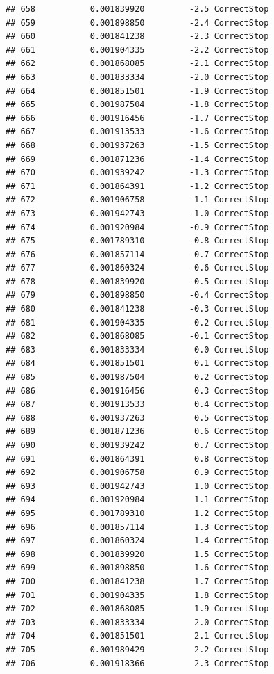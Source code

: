 \documentclass[
]{article}
\begin{document}
\begin{verbatim}
## 658           0.001839920         -2.5 CorrectStop
## 659           0.001898850         -2.4 CorrectStop
## 660           0.001841238         -2.3 CorrectStop
## 661           0.001904335         -2.2 CorrectStop
## 662           0.001868085         -2.1 CorrectStop
## 663           0.001833334         -2.0 CorrectStop
## 664           0.001851501         -1.9 CorrectStop
## 665           0.001987504         -1.8 CorrectStop
## 666           0.001916456         -1.7 CorrectStop
## 667           0.001913533         -1.6 CorrectStop
## 668           0.001937263         -1.5 CorrectStop
## 669           0.001871236         -1.4 CorrectStop
## 670           0.001939242         -1.3 CorrectStop
## 671           0.001864391         -1.2 CorrectStop
## 672           0.001906758         -1.1 CorrectStop
## 673           0.001942743         -1.0 CorrectStop
## 674           0.001920984         -0.9 CorrectStop
## 675           0.001789310         -0.8 CorrectStop
## 676           0.001857114         -0.7 CorrectStop
## 677           0.001860324         -0.6 CorrectStop
## 678           0.001839920         -0.5 CorrectStop
## 679           0.001898850         -0.4 CorrectStop
## 680           0.001841238         -0.3 CorrectStop
## 681           0.001904335         -0.2 CorrectStop
## 682           0.001868085         -0.1 CorrectStop
## 683           0.001833334          0.0 CorrectStop
## 684           0.001851501          0.1 CorrectStop
## 685           0.001987504          0.2 CorrectStop
## 686           0.001916456          0.3 CorrectStop
## 687           0.001913533          0.4 CorrectStop
## 688           0.001937263          0.5 CorrectStop
## 689           0.001871236          0.6 CorrectStop
## 690           0.001939242          0.7 CorrectStop
## 691           0.001864391          0.8 CorrectStop
## 692           0.001906758          0.9 CorrectStop
## 693           0.001942743          1.0 CorrectStop
## 694           0.001920984          1.1 CorrectStop
## 695           0.001789310          1.2 CorrectStop
## 696           0.001857114          1.3 CorrectStop
## 697           0.001860324          1.4 CorrectStop
## 698           0.001839920          1.5 CorrectStop
## 699           0.001898850          1.6 CorrectStop
## 700           0.001841238          1.7 CorrectStop
## 701           0.001904335          1.8 CorrectStop
## 702           0.001868085          1.9 CorrectStop
## 703           0.001833334          2.0 CorrectStop
## 704           0.001851501          2.1 CorrectStop
## 705           0.001989429          2.2 CorrectStop
## 706           0.001918366          2.3 CorrectStop

\end{verbatim}
\end{document}

